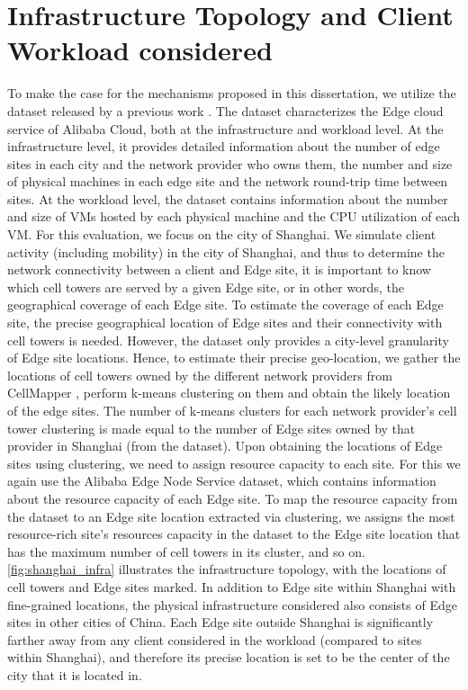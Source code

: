\section{Infrastructure Topology and Client Workload considered}
\label{sec:nep_infra_topology}
\par To make the case for the mechanisms proposed in this dissertation, we utilize the dataset released by a previous work \cite{xu2021cloud}. The dataset characterizes the Edge cloud service of Alibaba Cloud, both at the infrastructure and workload level. At the infrastructure level, it provides detailed information about the number of edge sites in each city and the network provider who owns them, the number and size of physical machines in each edge site and the network round-trip time between sites. At the workload level, the dataset contains information about the number and size of VMs hosted by each physical machine and the CPU utilization of each VM. For this evaluation, we focus on the city of Shanghai. We simulate client activity (including mobility) in the city of Shanghai, and thus to determine the network connectivity between a client and Edge site, it is important to know which cell towers are served by a given Edge site, or in other words, the geographical coverage of each Edge site. To estimate the coverage of each Edge site, the precise geographical location of Edge sites and their connectivity with cell towers is needed. However, the dataset only provides a city-level granularity of Edge site locations. Hence, to estimate their precise geo-location, we gather the locations of cell towers owned by the different network providers from CellMapper \cite{cellmapper}, perform k-means clustering on them and obtain the likely location of the edge sites. The number of k-means clusters for each network provider's cell tower clustering is made equal to the number of Edge sites owned by that provider in Shanghai (from the dataset). Upon obtaining the locations of Edge sites using clustering, we need to assign resource capacity to each site. For this we again use the Alibaba Edge Node Service dataset, which contains information about the resource capacity of each Edge site. To map the resource capacity from the dataset to an Edge site location extracted via clustering, we assigns the most resource-rich site's resources capacity in the dataset to the Edge site location that has the maximum number of cell towers in its cluster, and so on. \cref{fig:shanghai_infra} illustrates the infrastructure topology, with the locations of cell towers and Edge sites marked. In addition to Edge site within Shanghai with fine-grained locations, the physical infrastructure considered also consists of Edge sites in other cities of China. Each Edge site outside Shanghai is significantly farther away from any client considered in the workload (compared to sites within Shanghai), and therefore its precise location is set to be the center of the city that it is located in.

